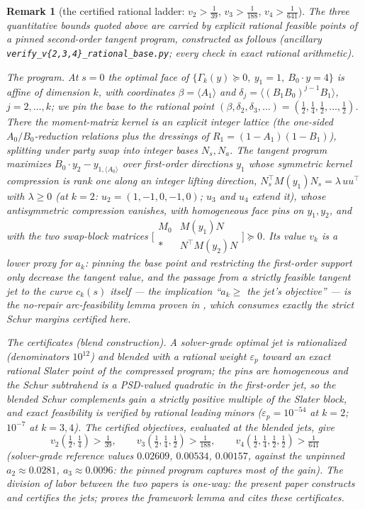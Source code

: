 \documentclass[11pt]{article}
\newtheorem{remark}[theorem]{Remark}
\begin{document}
\begin{remark}[the certified rational ladder:
$v_2>\tfrac1{39}$, $v_3>\tfrac1{188}$, $v_4>\tfrac1{641}$]\label{rem:ladder}
The three quantitative bounds quoted above are carried by explicit
rational feasible points of a \emph{pinned second-order tangent program},
constructed as follows (ancillary
\texttt{verify\_v\{2,3,4\}\_rational\_base.py}; every check in exact
rational arithmetic).

\emph{The program.} At $s=0$ the optimal face of
$\{\Gamma_k(y)\succeq0,\ y_1=1,\ B_0\cdot y=4\}$ is affine of dimension
$k$, with coordinates $\beta=\langle A_1\rangle$ and
$\delta_j=\langle(B_1B_0)^{j-1}B_1\rangle$, $j=2,\dots,k$; we \emph{pin}
the base to the rational point
$(\beta,\delta_2,\delta_3,\dots)=(\tfrac12,\tfrac14,\tfrac12,\dots,\tfrac12)$.
There the moment-matrix kernel is an explicit integer lattice (the
one-sided $A_0/B_0$-reduction relations plus the dressings of
$R_1=(1-A_1)(1-B_1)$), splitting under party swap into integer bases
$N_s,N_a$. The tangent program maximizes
$B_0\cdot y_2-y_{1,\langle A_0\rangle}$ over first-order directions $y_1$
whose symmetric kernel compression is rank one along an integer lifting
direction, $N_s^\top M(y_1)N_s=\lambda\,uu^\top$ with $\lambda\ge0$ (at
$k=2$: $u_2=(1,-1,0,-1,0)$; $u_3$ and $u_4$ extend it), whose
antisymmetric compression vanishes, with homogeneous face pins on
$y_1,y_2$, and with the two swap-block matrices
$\bigl[\begin{smallmatrix}M_0&M(y_1)N\\ \ast&N^\top
M(y_2)N\end{smallmatrix}\bigr]\succeq0$. Its value $v_k$ is a lower proxy
for $a_k$: pinning the base point and restricting the first-order support
only decrease the tangent value, and the passage from a strictly feasible
tangent jet to the curve $c_k(s)$ itself --- the implication
``$a_k\ge$ the jet's objective'' --- is the no-repair arc-feasibility
lemma proven in \cite{proof}, which consumes exactly the strict Schur
margins certified here.

\emph{The certificates (blend construction).} A solver-grade optimal jet
is rationalized (denominators $10^{12}$) and \emph{blended} with a
rational weight $\varepsilon_p$ toward an exact rational Slater point of the
compressed program; the pins are homogeneous and the Schur subtrahend is
a PSD-valued quadratic in the first-order jet, so the blended Schur
complements gain a strictly positive multiple of the Slater block, and
exact feasibility is verified by rational leading minors
($\varepsilon_p=10^{-54}$ at $k=2$; $10^{-7}$ at $k=3,4$). The certified
objectives, evaluated at the blended jets, give
\[
v_2(\tfrac12,\tfrac14)>\tfrac1{39},\qquad
v_3(\tfrac12,\tfrac14,\tfrac12)>\tfrac1{188},\qquad
v_4(\tfrac12,\tfrac14,\tfrac12,\tfrac12)>\tfrac1{641}
\]
(solver-grade reference values $0.02609$, $0.00534$, $0.00157$, against
the unpinned $a_2\approx0.0281$, $a_3\approx0.0096$: the pinned program
captures most of the gain). The division of labor between the two papers
is one-way: the present paper constructs and certifies the jets;
\cite{proof} proves the framework lemma and cites these certificates.
\end{remark}
\end{document}
